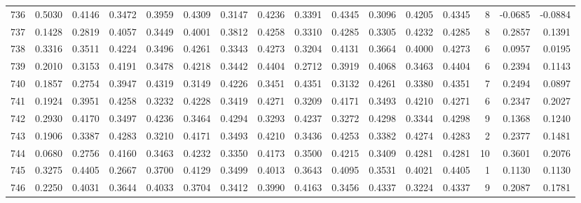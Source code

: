 \begin{tabular}{lrrrrrrrrrrrrrrr}
736 &      0.5030 &  0.4146 &  0.3472 &  0.3959 &  0.4309 &  0.3147 &  0.4236 &  0.3391 &  0.4345 &  0.3096 &   0.4205 &     0.4345 &      8 &                   -0.0685 &                    -0.0884 \\
737 &      0.1428 &  0.2819 &  0.4057 &  0.3449 &  0.4001 &  0.3812 &  0.4258 &  0.3310 &  0.4285 &  0.3305 &   0.4232 &     0.4285 &      8 &                    0.2857 &                     0.1391 \\
738 &      0.3316 &  0.3511 &  0.4224 &  0.3496 &  0.4261 &  0.3343 &  0.4273 &  0.3204 &  0.4131 &  0.3664 &   0.4000 &     0.4273 &      6 &                    0.0957 &                     0.0195 \\
739 &      0.2010 &  0.3153 &  0.4191 &  0.3478 &  0.4218 &  0.3442 &  0.4404 &  0.2712 &  0.3919 &  0.4068 &   0.3463 &     0.4404 &      6 &                    0.2394 &                     0.1143 \\
740 &      0.1857 &  0.2754 &  0.3947 &  0.4319 &  0.3149 &  0.4226 &  0.3451 &  0.4351 &  0.3132 &  0.4261 &   0.3380 &     0.4351 &      7 &                    0.2494 &                     0.0897 \\
741 &      0.1924 &  0.3951 &  0.4258 &  0.3232 &  0.4228 &  0.3419 &  0.4271 &  0.3209 &  0.4171 &  0.3493 &   0.4210 &     0.4271 &      6 &                    0.2347 &                     0.2027 \\
742 &      0.2930 &  0.4170 &  0.3497 &  0.4236 &  0.3464 &  0.4294 &  0.3293 &  0.4237 &  0.3272 &  0.4298 &   0.3344 &     0.4298 &      9 &                    0.1368 &                     0.1240 \\
743 &      0.1906 &  0.3387 &  0.4283 &  0.3210 &  0.4171 &  0.3493 &  0.4210 &  0.3436 &  0.4253 &  0.3382 &   0.4274 &     0.4283 &      2 &                    0.2377 &                     0.1481 \\
744 &      0.0680 &  0.2756 &  0.4160 &  0.3463 &  0.4232 &  0.3350 &  0.4173 &  0.3500 &  0.4215 &  0.3409 &   0.4281 &     0.4281 &     10 &                    0.3601 &                     0.2076 \\
745 &      0.3275 &  0.4405 &  0.2667 &  0.3700 &  0.4129 &  0.3499 &  0.4013 &  0.3643 &  0.4095 &  0.3531 &   0.4021 &     0.4405 &      1 &                    0.1130 &                     0.1130 \\
746 &      0.2250 &  0.4031 &  0.3644 &  0.4033 &  0.3704 &  0.3412 &  0.3990 &  0.4163 &  0.3456 &  0.4337 &   0.3224 &     0.4337 &      9 &                    0.2087 &                     0.1781 \\

\end{tabular}
